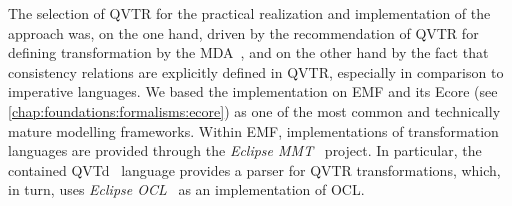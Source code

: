 


The selection of \gls{QVTR} for the practical realization and implementation of the approach was, on the one hand, driven by the recommendation of \gls{QVTR} for defining transformation by the \gls{MDA}~\cite{mda}, and on the other hand by the fact that consistency relations are explicitly defined in \gls{QVTR}, especially in comparison to imperative languages.
We based the implementation on \gls{EMF} and its Ecore \metametamodel (see \autoref{chap:foundations:formalisms:ecore}) as one of the most common and technically mature modelling frameworks.
Within \gls{EMF}, implementations of transformation languages are provided through the \emph{Eclipse MMT}~\cite{EclipseMMT} project.
In particular, the contained \gls{QVTd}~\cite{EclipseQVTd} language provides a parser for \gls{QVTR} transformations, which, in turn, uses \emph{Eclipse OCL}~\cite{EclipseOCL} as an implementation of \gls{OCL}.

